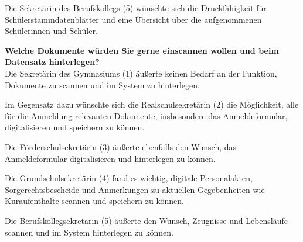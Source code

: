 Die Sekretärin des Berufskollegs (5) wünschte sich die Druckfähigkeit für Schülerstammdatenblätter und eine Übersicht über die aufgenommenen Schülerinnen und Schüler.

\textbf{Welche Dokumente würden Sie gerne einscannen wollen und beim Datensatz hinterlegen?}\\
Die Sekretärin des Gymnasiums (1) äußerte keinen Bedarf an der Funktion, Dokumente zu scannen und im System zu hinterlegen.

Im Gegensatz dazu wünschte sich die Realschulsekretärin (2) die Möglichkeit, alle für die Anmeldung relevanten Dokumente, insbesondere das Anmeldeformular, digitalisieren und speichern zu können.

Die Förderschulsekretärin (3) äußerte ebenfalls den Wunsch, das Anmeldeformular digitalisieren und hinterlegen zu können.

Die Grundschulsekretärin (4) fand es wichtig, digitale Personalakten, Sorgerechtsbescheide und Anmerkungen zu aktuellen Gegebenheiten wie Kuraufenthalte scannen und speichern zu können.

Die Berufskollegsekretärin (5) äußerte den Wunsch, Zeugnisse und Lebensläufe scannen und im System hinterlegen zu können.